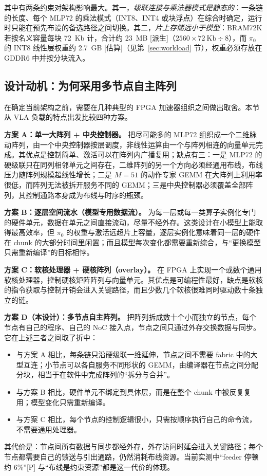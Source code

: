 \documentclass[a4paper,10.5pt]{ctexart}
\newcommand{\tP}{\textsf{[P]}}              %
\newcommand{\tD}{\textsf{[派生]}}           %
\newcommand{\tE}{\textsf{[估算]}}           %
\newcommand{\pizero}{$\pi_0$}
\begin{document}
其中有两条约束对架构影响最大。其一，\emph{级联连接与乘法器模式是静态的}：一条链的长度、每个 MLP72 的乘法模式（INT8、INT4 或块浮点）在综合时确定，运行时只能在预先布设的备选路径之间切换。其二，\emph{片上存储远小于模型}：BRAM72K 若按名义容量每块 72~Kb 计，合计约 23~MB \tD（$2560\times72~\text{Kb}\div8$），而 \pizero{} 的 INT8 线性层权重约 2.7~GB \tE（见第~\ref{sec:workload} 节），权重必须存放在 GDDR6 中并按分块流入。

\subsection{设计动机：为何采用多节点自主阵列}\label{sec:motiv}

在确定当前架构之前，需要在几种典型的 FPGA 加速器组织之间做出取舍。本节从 VLA 负载的特点出发比较四种方案。

\textbf{方案 A：单一大阵列 + 中央控制器。} 把尽可能多的 MLP72 组织成一个二维脉动阵列，由一个中央控制器按层调度，非线性运算由一个与阵列相连的向量单元完成。其优点是控制简单、激活可以在阵列内广播复用；缺点有三：一是 MLP72 的硬级联只在同列相邻单元之间存在，二维阵列的另一个方向必须经通用布线，布线压力随阵列规模超线性增长；二是 $M=51$ 的动作专家 GEMM 在大阵列上利用率很低，而阵列无法被拆开服务不同的 GEMM；三是中央控制器必须覆盖全部阵列，其控制通路本身成为布线与时序的瓶颈。

\textbf{方案 B：逐层空间流水（模型专用数据流）。} 为每一层或每一类算子实例化专门的硬件单元，数据在单元之间直接流动，尽量不经外存。这类设计在小模型上能取得最高效率，但 \pizero{} 的权重与激活远超片上容量，逐层实例化意味着同一层的硬件在 chunk 的大部分时间里闲置；而且模型每次变化都需要重新综合，与“更换模型只需重新编译”的目标相悖。

\textbf{方案 C：软核处理器 + 硬核阵列（overlay）。} 在 FPGA 上实现一个或数个通用软核处理器，控制硬核矩阵阵列与向量单元。其优点是可编程性最好，缺点是软核的指令获取与控制开销会进入关键路径，而且少数几个软核很难同时驱动数十条独立的链。

\textbf{方案 D（本设计）：多节点自主阵列。} 把阵列拆成数十个小而独立的节点，每个节点有自己的程序、自己的 NoC 接入点，节点之间只通过外存交换数据与同步。它在上述三者之间取了折中：
\begin{itemize}
  \item 与方案 A 相比，每条链只沿硬级联一维延伸，节点之间不需要 fabric 中的大型互连；小节点可以各自服务不同形状的 GEMM，由编译器在节点之间分配分块，相当于在软件中完成阵列的“拆分与合并”。
  \item 与方案 B 相比，硬件单元不绑定到具体层，而是在整个 chunk 中被反复复用；模型变化只需重新编译。
  \item 与方案 C 相比，每个节点的控制逻辑很小，只需按顺序执行自己的命令流，不需要通用处理器。
\end{itemize}
其代价是：节点间所有数据与同步都经外存，外存访问时延会进入关键路径；每个节点都需要自己的馈送与引出通路，仍然消耗布线资源。当前实测中“feeder 停顿约 6\%”\tP{} 与“布线是约束资源”都是这一代价的体现。
\end{document}
